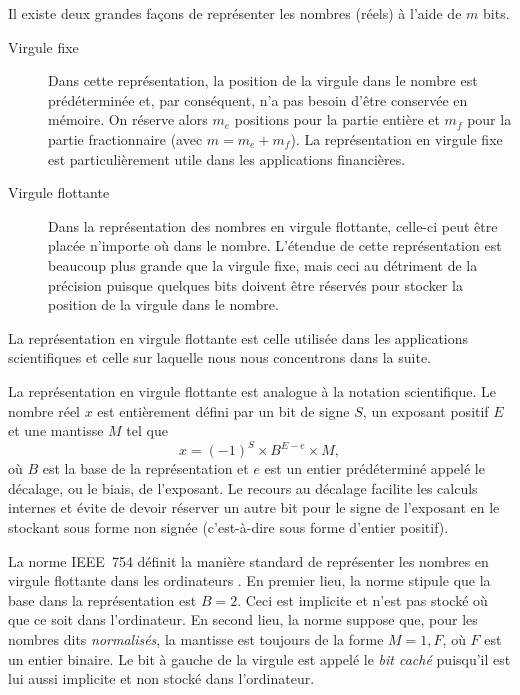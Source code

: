 \documentclass[letterpaper,11pt]{memoir}
\theoremstyle{plain}
\theoremstyle{definition}
\theoremstyle{remark}
\begin{document}
Il existe deux grandes façons de représenter les nombres (réels) à
l'aide de $m$ bits.
\begin{description}
\item[Virgule fixe] Dans cette représentation, la position de la
  virgule dans le nombre est prédéterminée et, par conséquent, n'a pas
  besoin d'être conservée en mémoire. On réserve alors $m_e$ positions
  pour la partie entière et $m_f$ pour la partie fractionnaire (avec
  $m = m_e + m_f$). La représentation en virgule fixe est
  particulièrement utile dans les applications financières.
\item[Virgule flottante] Dans la représentation des nombres en virgule
  flottante, celle-ci peut être placée n'importe où dans le nombre.
  L'étendue de cette représentation est beaucoup plus grande que la
  virgule fixe, mais ceci au détriment de la précision puisque
  quelques bits doivent être réservés pour stocker la position de la
  virgule dans le nombre.
\end{description}
La représentation en virgule flottante est celle utilisée dans les
applications scientifiques et celle sur laquelle nous nous concentrons
dans la suite.

La représentation en virgule flottante est analogue à la notation
scientifique. Le nombre réel $x$ est entièrement défini par un bit de
signe $S$, un exposant positif $E$ et une mantisse $M$ tel que
\begin{equation}
  \label{eq:ordinateurs:def_floating-point}
  x = (-1)^S \times B^{E - e} \times M,
\end{equation}
où $B$ est la base de la représentation et $e$ est un entier
prédéterminé appelé le décalage, ou le biais, de l'exposant. Le
recours au décalage facilite les calculs internes et évite de devoir
réserver un autre bit pour le signe de l'exposant en le stockant sous
forme non signée (c'est-à-dire sous forme d'entier positif).

La norme IEEE~754 définit la manière standard de représenter les
nombres en virgule flottante dans les ordinateurs \citep[][pour une
excellente présentation]{IEEE:754,Wikipedia:IEEE754}. En premier lieu,
la norme stipule que la base dans la représentation est $B = 2$. Ceci
est implicite et n'est pas stocké où que ce soit dans l'ordinateur. En
second lieu, la norme suppose que, pour les nombres dits
\emph{normalisés}, la mantisse est toujours de la forme $M = 1,F$, où
$F$ est un entier binaire. Le bit à gauche de la virgule est appelé le
\emph{bit caché} puisqu'il est lui aussi implicite et non stocké dans
l'ordinateur.
\end{document}
